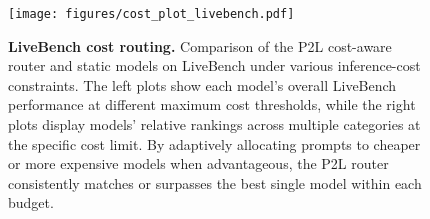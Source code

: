 \begin{figure}[p]
    \vspace{-0.5cm}
    \centering
    \texttt{[image: figures/cost\_plot\_livebench.pdf]}
    \caption{\textbf{LiveBench cost routing.} Comparison of the P2L cost-aware router and static models on LiveBench under various inference-cost constraints. The left plots show each model’s overall LiveBench performance at different maximum cost thresholds, while the right plots display models’ relative rankings across multiple categories at the specific cost limit. By adaptively allocating prompts to cheaper or more expensive models when advantageous, the P2L router consistently matches or surpasses the best single model within each budget.}
    \label{fig:livebench_cost_fig}
\end{figure}

